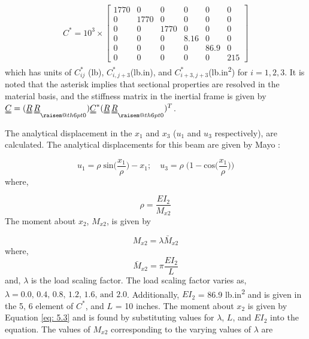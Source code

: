\documentclass[letterpaper,12pt]{article}
\makeatletter
\newcommand{\raisemath}[1]{\mathpalette{\raisem@th{#1}}}
\newcommand{\raisem@th}[3]{\raisebox{#1}{$#2#3$}}
\makeatother
\begin{document}
 \begin{align*}
 C^* = 10^3 \times
 	\label{tab:Stiffness 1}
 	{\left[\begin{matrix}
 		1770 & 0    & 0    & 0    & 0    & 0   \\
 		0    & 1770 & 0    & 0    & 0    & 0   \\
 		0    & 0    & 1770 & 0    & 0    & 0   \\
 		0    & 0    & 0    & 8.16 & 0    & 0   \\
 		0    & 0    & 0    & 0    & 86.9 & 0   \\
 		0    & 0    & 0    & 0    & 0    & 215
 	\end{matrix}\right]}
 \end{align*} 
which has units of $C^*_{ij}$ (lb), $C^*_{i,j+3}$(lb.in), and $C^*_{i+3, j+3}$(lb.in\textsuperscript{2}) for $i=1, 2, 3$. It is noted that the asterisk implies that sectional properties are resolved in the material basis, and the stiffness matrix in the inertial frame is given by $\uuline{C} = (\uuline{R}\,\uuline{R}_{\raisemath{6pt}{0}})\uuline{C}^*(\uuline{R}\,\uuline{R}_{\raisemath{6pt}{0}})^T$.


The analytical displacement in the $x_1$ and $x_3$ ($u_1$ and $u_3$ respectively), are calculated. The analytical displacements for this beam are given by Mayo \cite{Mayo-etal:2004}:

\begin{equation}
\label{eq: 5.1}
u_1 = \rho\;\text{sin}\bigg(\dfrac{x_1}{\rho}\bigg)-x_1; \quad u_3 = \rho\;\bigg(1-\text{cos}\bigg(\frac{x_1}{\rho}\bigg)\bigg)
\end{equation}
where,

\begin{equation}
\label{eq: 5.2}
\rho = \dfrac{EI_2}{M_{x2}}
\end{equation} 
The moment about $x_2$, $M_{x2}$, is given by

\begin{equation}
\label{eq: 5.3}
M_{x2}={\lambda\bar{M}_{x2}}
\end{equation}
where, 
\begin{equation}
\bar{M}_{x2} = \pi\dfrac{EI_2}{L}
\end{equation} 
and, $\lambda$ is the load scaling factor.
The load scaling factor varies as, $\lambda = \text{0.0, 0.4, 0.8, 1.2, 1.6, and 2.0}$. Additionally, $EI_2$ = 86.9 lb.in\textsuperscript{2} and is given in the 5, 6 element of $C^*$, and $L$ = 10 inches. The moment about $x_2$ is given by Equation \ref{eq: 5.3} and is found by substituting values for $\lambda$, $L$, and $EI_2$ into the equation. The values of $M_{x2}$ corresponding to the varying values of $\lambda$ are
\end{document}
